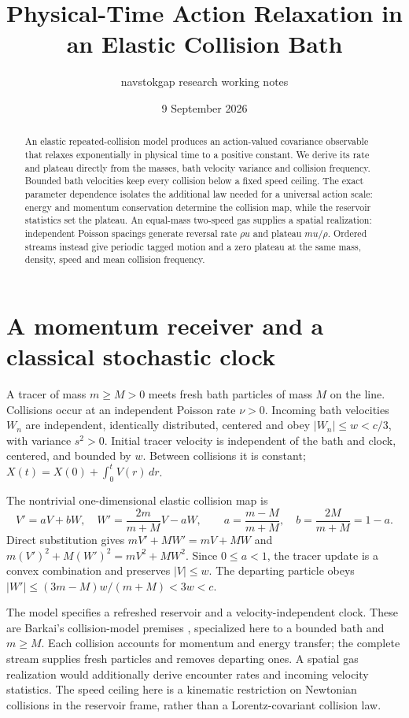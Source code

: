 \documentclass[11pt,a4paper]{article}
\title{Physical-Time Action Relaxation in an Elastic Collision Bath}
\author{navstokgap research working notes}
\date{9 September 2026}
\begin{document}
\maketitle
\begin{abstract}
An elastic repeated-collision model produces an action-valued covariance
observable that relaxes exponentially in physical time to a positive constant.
We derive its rate and plateau directly from the masses, bath velocity variance
and collision frequency. Bounded bath velocities keep every collision below a
fixed speed ceiling. The exact parameter dependence isolates the additional
law needed for a universal action scale: energy and momentum conservation
determine the collision map, while the reservoir statistics set the plateau.
An equal-mass two-speed gas supplies a spatial realization: independent
Poisson spacings generate reversal rate $\rho u$ and plateau $mu/\rho$.
Ordered streams instead give periodic tagged motion and a zero plateau at
the same mass, density, speed and mean collision frequency.
\end{abstract}

\section{A momentum receiver and a classical stochastic clock}
A tracer of mass $m\ge M>0$ meets fresh bath particles of mass $M$ on the
line. Collisions occur at an independent Poisson rate $\nu>0$. Incoming bath
velocities $W_n$ are independent, identically distributed, centered and obey
$|W_n|\le w<c/3$, with variance $s^2>0$. Initial tracer velocity is independent
of the bath and clock, centered, and bounded by $w$. Between collisions it is
constant; $X(t)=X(0)+\int_0^t V(r)\,dr$.

The nontrivial one-dimensional elastic collision map is
\begin{equation}\label{eq:map}
 V'=aV+bW,\quad W'=\frac{2m}{m+M}V-aW,\qquad
 a=\frac{m-M}{m+M},\quad b=\frac{2M}{m+M}=1-a.
\end{equation}
Direct substitution gives $mV'+MW'=mV+MW$ and
$m(V')^2+M(W')^2=mV^2+MW^2$.
Since $0\le a<1$, the tracer update is a convex combination and preserves
$|V|\le w$. The departing particle obeys
$|W'|\le(3m-M)w/(m+M)<3w<c$.

The model specifies a refreshed reservoir and a velocity-independent clock.
These are Barkai's collision-model premises
\cite[pp.~3--5, (2)--(12)]{Barkai2003StableEquilibrium}, specialized here to a
bounded bath and $m\ge M$.
Each collision accounts for momentum and energy transfer; the complete stream
supplies fresh particles and removes departing ones. A spatial gas realization
would additionally derive encounter rates and incoming velocity statistics.
The speed ceiling here is a kinematic restriction on Newtonian collisions in
the reservoir frame, rather than a Lorentz-covariant collision law.
\end{document}
